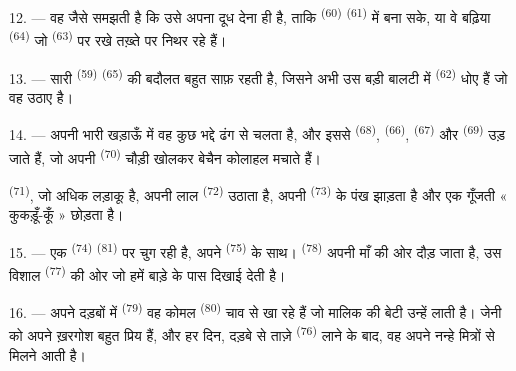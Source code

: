12. --- वह जैसे समझती है कि उसे अपना दूध देना ही है, ताकि
 \textsuperscript{(60)}  \textsuperscript{(61)}
में  बना सके, या वे बढ़िया  \textsuperscript{(64)} जो
 \textsuperscript{(63)} पर रखे तख़्ते पर निथर रहे हैं।

13. --- सारी  \textsuperscript{(59)} 
\textsuperscript{(65)} की बदौलत बहुत साफ़ रहती है, जिसने अभी उस बड़ी बालटी में
 \textsuperscript{(62)} धोए हैं जो वह उठाए है।

\VUsaut{3.0mm}
\VUsaut{3.0mm}

14. --- अपनी भारी खड़ाऊँ में वह कुछ भद्दे ढंग से चलता है, और इससे
 \textsuperscript{(68)},  \textsuperscript{(66)},
 \textsuperscript{(67)} और  \textsuperscript{(69)}
उड़ जाते हैं, जो अपनी  \textsuperscript{(70)} चौड़ी खोलकर बेचैन
कोलाहल मचाते हैं।

 \textsuperscript{(71)}, जो अधिक लड़ाकू है, अपनी लाल
 \textsuperscript{(72)} उठाता है, अपनी 
\textsuperscript{(73)} के पंख झाड़ता है और एक गूँजती « कुकड़ूँ-कूँ » छोड़ता है।

15. --- एक  \textsuperscript{(74)}
 \textsuperscript{(81)} पर चुग रही है, अपने 
\textsuperscript{(75)} के साथ।  \textsuperscript{(78)} अपनी माँ की ओर दौड़ जाता है,
उस विशाल  \textsuperscript{(77)} की ओर जो हमें बाड़े के पास दिखाई
देती है।

16. --- अपने दड़बों में  \textsuperscript{(79)} वह कोमल
 \textsuperscript{(80)} चाव से खा रहे हैं जो मालिक की बेटी उन्हें लाती
है। जेनी को अपने ख़रगोश बहुत प्रिय हैं, और हर दिन, दड़बे से ताज़े 
\textsuperscript{(76)} लाने के बाद, वह अपने नन्हे मित्रों से मिलने आती है।
\VUsaut{6.0mm}
\VUfilet{22mm}
